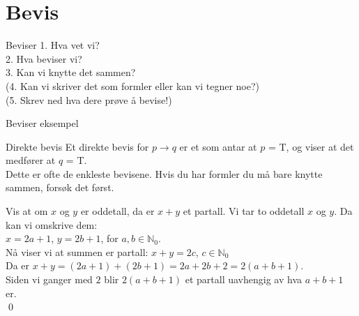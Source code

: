 \section{Bevis}

\begin{frame}{Beviser}
    1. Hva vet vi?\\
    
    2. Hva beviser vi? \\
    
    3. Kan vi knytte det sammen?\\
    
    (4. Kan vi skriver det som formler eller kan vi tegner noe?)\\

    (5. Skrev ned hva dere prøve å bevise!) %
\end{frame}

\begin{frame}{Beviser eksempel}
\end{frame}

\begin{frame}{Direkte bevis}
    Et direkte bevis for $p \rightarrow q$ er et som antar at $p$ = T, og viser at det medfører at $q$ = T.\\
    Dette er ofte de enkleste bevisene. Hvis du har formler du må bare knytte sammen, forsøk det først.\\
    
    \pause
    \begin{block}{Vis at om $x$ og $y$ er oddetall, da er $x + y$ et partall.}
        Vi tar to oddetall $x$ og $y$. Da kan vi omskrive dem:\\
        $x = 2a+1$, $y = 2b+1$, for $a, b \in \mathbb{N}_0$.\\
        Nå viser vi at summen er partall: $x+y=2c$, $c \in \mathbb{N}_0$\\
        Da er $x + y = (2a+1) + (2b+1) = 2a + 2b + 2 = 2(a+b+1)$.\\
        Siden vi ganger med $2$ blir $2(a + b + 1)$ et partall uavhengig av hva $a + b + 1$ er.\\
        \qed
    \end{block}
\end{frame}

